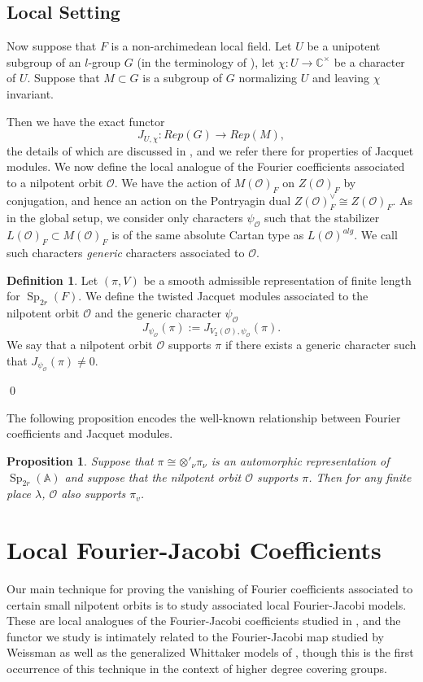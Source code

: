 \documentclass[11pt,reqno]{amsart}
\newtheorem{Prop}[Thm]{Proposition}
\theoremstyle{definition}
\newtheorem{Def}[Thm]{Definition}
\theoremstyle{remark}
\theoremstyle{definition}
\begin{document}
\subsection{Local Setting}
 Now suppose that $F$ is a non-archimedean local field. Let $U$ be a unipotent subgroup of an $l$-group $G$ (in the terminology of \cite{BZ}), let $\chi :U\to {\mathbb C}^\times$ be a character of $U$. Suppose that $M\subset G$ is a subgroup of $G$ normalizing $U$ and leaving $\chi$ invariant. 

Then we have the exact functor 
\[
J_{U,\chi}: Rep(G) \to Rep(M),
\]
the details of which are discussed in \cite{BZ}, and we refer there for properties of Jacquet modules. 
We now define the local analogue of the Fourier coefficients associated to a nilpotent orbit ${\mathcal{O}}$. We have the action of $M({\mathcal{O}})_F$ on $Z({\mathcal{O}})_F$ by conjugation, and hence an action on the Pontryagin dual $Z({\mathcal{O}})_F^\vee \cong Z({\mathcal{O}})_F$. As in the global setup, we consider only characters $\psi_{\mathcal{O}}$ such that the stabilizer $L({\mathcal{O}})_F\subset M({\mathcal{O}})_F$ is of the same absolute Cartan type as $L({\mathcal{O}})^{alg}$. We call such characters \emph{generic} characters associated to ${\mathcal{O}}$.
\begin{Def}
Let $(\pi,V)$ be a smooth admissible representation of finite length for $\operatorname{Sp}_{2r}(F)$. We define the twisted Jacquet modules associated to the nilpotent orbit ${\mathcal{O}}$ and the generic character $\psi_{\mathcal{O}}$
\[
J_{\psi_{\mathcal{O}}}(\pi) := J_{V_2({\mathcal{O}}),\psi_{\mathcal{O}}}(\pi).
\]
We say that a nilpotent orbit ${\mathcal{O}}$ supports $\pi$ if there exists a generic character such that $J_{\psi_{\mathcal{O}}}(\pi) \neq 0$.
\end{Def}\qed

The following proposition encodes the well-known relationship between Fourier coefficients and Jacquet modules.
\begin{Prop}\label{Prop: local-global}
Suppose that $\pi \cong \otimes'_\nu \pi_\nu$ is an automorphic representation of $\operatorname{Sp}_{2r}({\mathbb A})$ and suppose that the nilpotent orbit ${\mathcal{O}}$ supports $\pi$.
Then for any finite place ${\lambda}$, ${\mathcal{O}}$ also supports $\pi_v$.
\end{Prop}
\section{Local Fourier-Jacobi Coefficients}\label{Section: local FJ}
Our main technique for proving the vanishing of Fourier coefficients associated to certain small nilpotent orbits is to study associated local Fourier-Jacobi models. These are local analogues of the Fourier-Jacobi coefficients studied in  \cite{GRS2}, and the functor we study is intimately related to the Fourier-Jacobi map studied by Weissman \cite{W1} as well as the generalized Whittaker models of \cite{GGS}, though this is the first occurrence of this technique in the context of higher degree covering groups.
\end{document}
